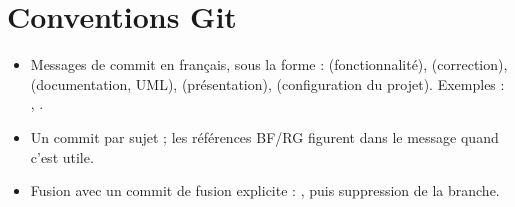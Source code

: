 \section{Conventions Git}

\begin{itemize}
  \item Messages de commit en français, sous la forme  :  (fonctionnalité), 
        (correction),  (documentation, UML),  (présentation),  (configuration du projet).
        Exemples : ,
        .
  \item Un commit par sujet ; les références BF/RG figurent dans le message quand c'est utile.
  \item Fusion avec un commit de fusion explicite : , puis suppression de la branche.
\end{itemize}
